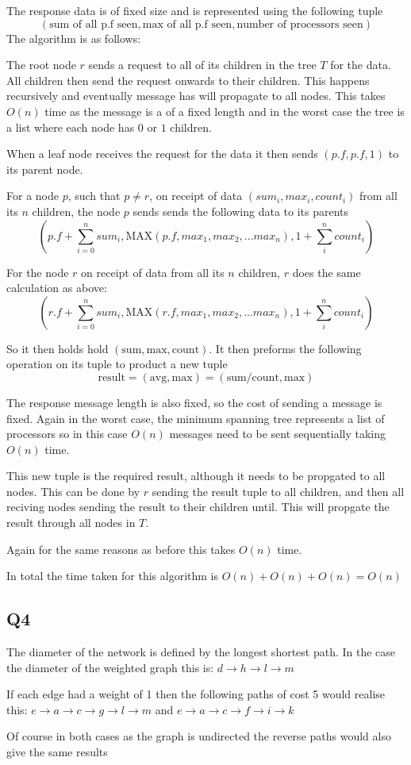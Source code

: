 \documentclass[11pt]{article}
\begin{document}
The response data is of fixed size and is represented using the following tuple
$$
(\text{sum of all p.f seen}, \text{max of all p.f seen}, \text{number of processors seen})
$$
The algorithm is as follows:

The root node $r$ sends a request to all of its children in the tree $T$ for the data. All children then send the request onwards to their children. This happens recursively and eventually  message has will propagate to all nodes. This takes $O(n)$ time as the message is a of a fixed length and in the worst case the tree is a list where each node has $0$ or $1$ children.

When a leaf node receives the request for the data it then sends $(p.f, p.f, 1)$ to its parent node.

For a node $p$, such that $p \neq r$, on receipt of data $(sum_i, max_i, count_i)$ from all its $n$ children, the node $p$ sends sends the following data to its parents 
$$
(p.f + \sum_{i=0}^n  sum_i, \text{MAX}(p.f, max_1, max_2, ... max_n), 1 + \sum_i^n count_i)
$$

For the node $r$ on receipt of data from all its $n$ children, $r$ does the same calculation as above:
$$
(r.f + \sum_{i=0}^n  sum_i, \text{MAX}(r.f, max_1, max_2, ... max_n), 1 + \sum_i^n count_i)
$$

So it then holds hold $(\text{sum}, \text{max}, \text{count})$.  It then preforms the following operation on its tuple to product a new tuple 
$$\text{result} = (\text{avg}, \text{max}) = (\text{sum/count}, \text{max})$$

The response message length is also fixed, so the cost of sending a message is fixed.
Again in the worst case, the minimum spanning tree represents a list of processors so in this case $O(n)$ messages need to be sent sequentially taking $O(n)$ time.

This new tuple is the required result, although it needs to be propgated to all nodes. This can be done by $r$ sending the result tuple to all children, and then all reciving nodes sending the result to their children until. This will propgate the result through all nodes in $T$.

Again for the same reasons as before this takes $O(n)$ time.


In total the time taken for this algorithm is $O(n) + O(n) + O(n) = O(n)$

\subsection*{Q4}
The diameter of the network is defined by the longest shortest path. In the case
the diameter of the weighted graph this is:
$d \rightarrow h \rightarrow l \rightarrow m$

If each edge had a weight of 1 then the following paths of cost 5 would realise this:
$ e \rightarrow a \rightarrow c \rightarrow g \rightarrow l \rightarrow m$ and
$e \rightarrow a \rightarrow c \rightarrow f \rightarrow i \rightarrow k$

Of course in both cases as the graph is undirected the reverse paths would also give the same results
\end{document}
